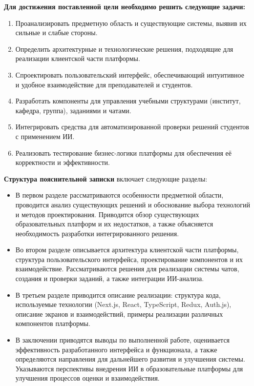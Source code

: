 \textbf{Для достижения поставленной цели необходимо решить следующие задачи:}
\begin{enumerate}
\item Проанализировать предметную область и существующие системы, выявив их сильные и слабые стороны.
\item Определить архитектурные и технологические решения, подходящие для реализации клиентской части платформы.
\item Спроектировать пользовательский интерфейс, обеспечивающий интуитивное и удобное взаимодействие для преподавателей и студентов.
\item Разработать компоненты для управления учебными структурами (институт, кафедра, группа), заданиями и чатами.
\item Интегрировать средства для автоматизированной проверки решений студентов с применением ИИ.
\item Реализовать тестирование бизнес-логики платформы для обеспечения её корректности и эффективности.
\end{enumerate}

\textbf{Структура пояснительной записки} включает следующие разделы:
\begin{itemize}
\item В первом разделе рассматриваются особенности предметной области, проводится анализ существующих решений и обоснование выбора технологий и методов проектирования. Приводится обзор существующих образовательных платформ и их недостатков, а также объясняется необходимость разработки интегрированного решения.
\item Во втором разделе описывается архитектура клиентской части платформы, структура пользовательского интерфейса, проектирование компонентов и их взаимодействие. Рассматриваются решения для реализации системы чатов, создания и проверки заданий, а также интеграции ИИ-анализа.
\item В третьем разделе приводится описание реализации: структура кода, используемые технологии (Next.js, React, TypeScript, Redux, Auth.js), описание экранов и взаимодействий, примеры реализации различных компонентов платформы.
\item В заключении приводятся выводы по выполненной работе, оценивается эффективность разработанного интерфейса и функционала, а также определяются направления для дальнейшего развития и улучшения системы. Указываются перспективы внедрения ИИ в образовательные платформы для улучшения процессов оценки и взаимодействия.
\end{itemize}
